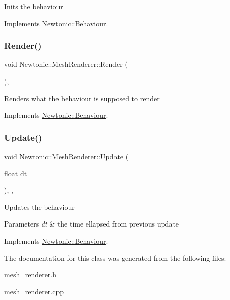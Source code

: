 Inits the behaviour 

Implements \mbox{\hyperlink{classNewtonic_1_1Behaviour_a54a1d17213841de1d7bde8aaadfc99e4}{Newtonic\+::\+Behaviour}}.

\mbox{\label{classNewtonic_1_1MeshRenderer_a5b996a9b972ba45363c84f667f302217}} 
\subsubsection{\texorpdfstring{Render()}{Render()}}
{\footnotesize\ttfamily void Newtonic\+::\+Mesh\+Renderer\+::\+Render (\begin{DoxyParamCaption}{ }\end{DoxyParamCaption})\hspace{0.3cm}{\ttfamily [override]}, {\ttfamily [virtual]}}

Renders what the behaviour is supposed to render 

Implements \mbox{\hyperlink{classNewtonic_1_1Behaviour_ab219950e152ca8b9cb6f54d024667627}{Newtonic\+::\+Behaviour}}.

\mbox{\label{classNewtonic_1_1MeshRenderer_aaa8628b208cc9615d9b3ad91c9d06c4e}} 
\subsubsection{\texorpdfstring{Update()}{Update()}}
{\footnotesize\ttfamily void Newtonic\+::\+Mesh\+Renderer\+::\+Update (\begin{DoxyParamCaption}\item[{float}]{dt }\end{DoxyParamCaption})\hspace{0.3cm}{\ttfamily [inline]}, {\ttfamily [override]}, {\ttfamily [virtual]}}

Updates the behaviour 
\begin{DoxyParams}{Parameters}
{\em dt} & the time ellapsed from previous update \\
\hline
\end{DoxyParams}


Implements \mbox{\hyperlink{classNewtonic_1_1Behaviour_aaed714f38c7b270381e81958b280d248}{Newtonic\+::\+Behaviour}}.



The documentation for this class was generated from the following files\+:\begin{DoxyCompactItemize}
\item 
mesh\+\_\+renderer.\+h\item 
mesh\+\_\+renderer.\+cpp\end{DoxyCompactItemize}
